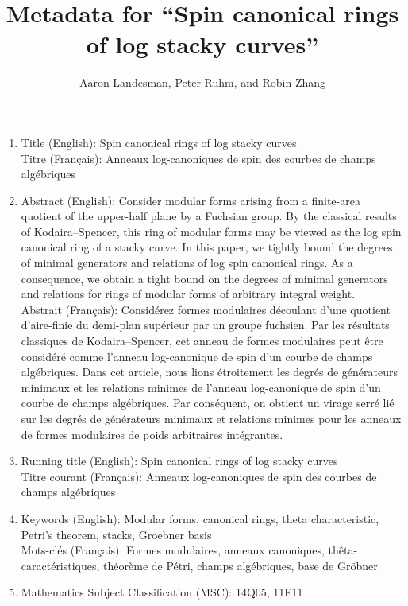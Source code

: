 \documentclass[10 pt]{amsart}
\title{Metadata for ``Spin canonical rings of log stacky curves''}
\author{Aaron Landesman, Peter Ruhm, and Robin Zhang}
\theoremstyle{plain}
\theoremstyle{definition}
\theoremstyle{remark}
\numberwithin{equation}{section}
\begin{document}
\maketitle

\begin{enumerate}
	\item Title (English): Spin canonical rings of log stacky curves \\
		Titre (Fran\c{c}ais): Anneaux log-canoniques de spin des
		courbes de champs alg\'{e}briques
	\item Abstract (English): Consider modular forms arising from a
		finite-area quotient of the upper-half plane by a Fuchsian group.
		By the classical results of Kodaira--Spencer, this ring of
		modular forms may be viewed as the log spin canonical ring of a
		stacky curve. In this paper, we tightly bound the degrees of
		minimal generators and relations of log spin canonical rings.
		As a 	consequence, we obtain a tight bound on the degrees of
		minimal generators and relations for rings of modular forms of
		arbitrary integral weight. \\
		Abstrait (Fran\c{c}ais): Consid\'{e}rez formes modulaires
		d\'{e}coulant d'une quotient d'aire-finie du demi-plan
		sup\'{e}rieur par un groupe fuchsien. Par les r\'{e}sultats
		classiques de Kodaira--Spencer, cet anneau de formes modulaires
		peut \^{e}tre consid\'{e}r\'{e} comme l'anneau log-canonique de
		spin d'un courbe de champs alg\'{e}briques. Dans cet article, nous
		lions \'{e}troitement les degr\'{e}s de g\'{e}n\'{e}rateurs
		minimaux et les relations minimes de l'anneau log-canonique de spin
		d'un courbe de champs alg\'{e}briques. Par conséquent, on obtient
		un virage serr\'{e} li\'{e} sur les degr\'{e}s de
		g\'{e}n\'{e}rateurs minimaux et relations minimes pour les anneaux
		de formes modulaires de poids arbitraires int\'{e}grantes.
	\item Running title (English): Spin canonical rings of log stacky
		curves \\
		Titre courant (Fran\c{c}ais): Anneaux log-canoniques de spin des
		courbes de champs alg\'{e}briques
	\item Keywords (English): Modular forms, canonical rings, theta
		characteristic, Petri's theorem, stacks, Groebner basis \\
		Mots-cl\'{e}s (Fran\c{c}ais): Formes modulaires, anneaux canoniques,
		th\^{e}ta-caract\'{e}ristiques, th\'{e}or\`{e}me de P\'{e}tri,
		champs alg\'{e}briques, base de Gr\"{o}bner
	\item Mathematics Subject Classification (MSC): 14Q05, 11F11
  \end{enumerate}
\end{document}

